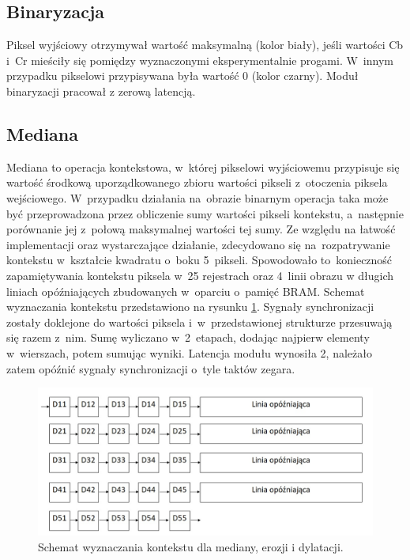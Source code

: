 \subsection{Binaryzacja}
\label{subsec:Binaryzacja}
Piksel wyjściowy otrzymywał wartość maksymalną (kolor biały), jeśli wartości Cb i~Cr mieściły się pomiędzy wyznaczonymi eksperymentalnie progami. W~innym przypadku pikselowi przypisywana była wartość 0 (kolor czarny). Moduł binaryzacji pracował z zerową latencją.
\subsection{Mediana}
\label{subsec:Mediana}
Mediana to operacja kontekstowa, w~której pikselowi wyjściowemu przypisuje się wartość środkową uporządkowanego zbioru wartości pikseli z~otoczenia piksela wejściowego. W~przypadku działania na~obrazie binarnym operacja taka może być przeprowadzona przez obliczenie sumy wartości pikseli kontekstu, a~następnie porównanie jej z~połową maksymalnej wartości tej sumy. Ze względu na łatwość implementacji oraz wystarczające działanie, zdecydowano się na~rozpatrywanie kontekstu w~kształcie kwadratu o~boku 5~pikseli. Spowodowało to~konieczność zapamiętywania kontekstu piksela w~25 rejestrach oraz 4~linii obrazu w długich liniach opóźniających zbudowanych w~oparciu o~pamięć BRAM. Schemat wyznaczania kontekstu przedstawiono na rysunku \ref{fig:kontekst}. Sygnały synchronizacji zostały doklejone do wartości piksela i~w~przedstawionej strukturze przesuwają się razem z~nim. Sumę wyliczano w~2~etapach, dodając najpierw elementy w~wierszach, potem sumując wyniki. Latencja modułu wynosiła 2, należało zatem opóźnić sygnały synchronizacji o~tyle taktów zegara.
\begin{figure}[h]
	\centering
	\includegraphics[width=\textwidth]{kontekst.jpg}
	\caption{Schemat wyznaczania kontekstu dla mediany, erozji i dylatacji.}
	\label{fig:kontekst}
\end{figure}  
